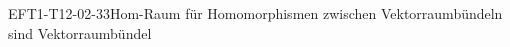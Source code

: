 
\begin{EXA}{EFT1-T12-02-33}{Hom-Raum für Homomorphismen zwischen Vektorraumbündeln sind Vektorraumbündel}
\end{EXA}
